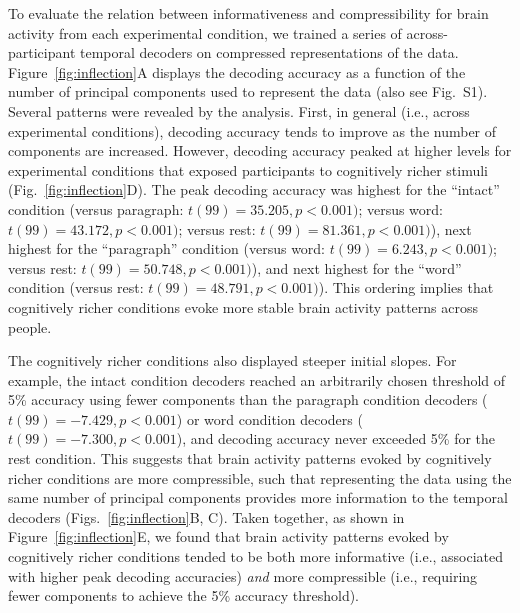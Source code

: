 \documentclass[english, 11pt]{article}
\newcommand{\varExplained}{S1}
\begin{document}
To evaluate the relation between informativeness and compressibility for brain
activity from each experimental condition, we trained a series of
across-participant temporal decoders on compressed representations of the data.
Figure~\ref{fig:inflection}A displays the decoding accuracy as a function of
the number of principal components used to represent the data (also see
Fig.~\varExplained). Several patterns were revealed by the analysis. First, in
general (i.e., across experimental conditions), decoding accuracy tends to
improve as the number of components are increased. However, decoding accuracy
peaked at higher levels for experimental conditions that exposed participants
to cognitively richer stimuli (Fig.~\ref{fig:inflection}D). The peak decoding
accuracy was highest for the ``intact'' condition (versus paragraph: $t(99) =
35.205, p < 0.001)$; versus word: $t(99) = 43.172, p < 0.001)$; versus rest:
$t(99) = 81.361, p < 0.001)$), next highest for the ``paragraph'' condition
(versus word: $t(99) = 6.243, p < 0.001)$; versus rest: $t(99) = 50.748, p <
0.001)$), and next highest for the ``word'' condition (versus rest: $t(99) =
48.791, p < 0.001)$). This ordering implies that cognitively richer conditions
evoke more stable brain activity patterns across people.

The cognitively richer conditions also displayed steeper initial slopes. For
example, the intact condition decoders reached an arbitrarily chosen threshold
of 5\% accuracy using fewer components than the paragraph condition decoders
($t(99) = -7.429, p < 0.001$) or word condition decoders ($t(99) = -7.300, p <
0.001$), and decoding accuracy never exceeded 5\% for the rest condition. This
suggests that brain activity patterns evoked by cognitively richer conditions
are more compressible, such that representing the data using the same number of
principal components provides more information to the temporal decoders
(Figs.~\ref{fig:inflection}B, C). Taken together, as shown in
Figure~\ref{fig:inflection}E, we found that brain activity patterns evoked by
cognitively richer conditions tended to be both more informative (i.e.,
associated with higher peak decoding accuracies) \textit{and} more compressible
(i.e., requiring fewer components to achieve the 5\% accuracy threshold).
\end{document}
